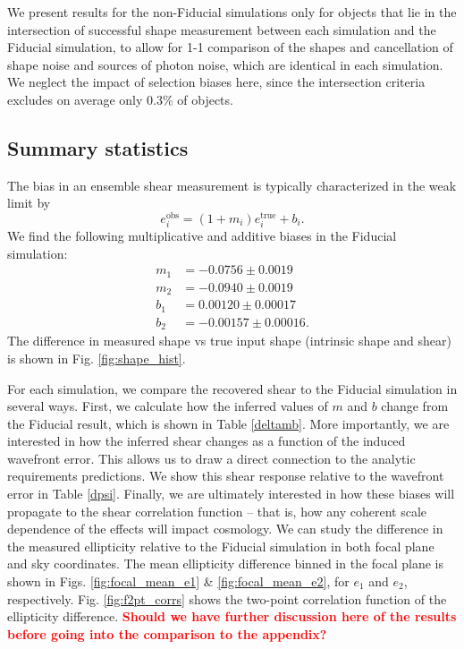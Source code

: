 \documentclass[aps,prd, amsmath,amssymb,superscriptaddress,showkeys,nofootinbib,reprint,preprintnumbers]{revtex4-1}
\newcommand{\verify}[1]{\textcolor{red}{\textbf{{#1}}}}
\begin{document}
We present results for the non-Fiducial simulations only for objects that lie in the intersection of successful shape measurement between each simulation and the Fiducial simulation, to allow for 1-1 comparison of the shapes and cancellation of shape noise and sources of photon noise, which are identical in each simulation. 
We neglect the impact of selection biases here, since the intersection criteria excludes on average only 0.3\% of objects.

\subsection{Summary statistics}

The bias in an ensemble shear measurement is typically characterized in the weak limit by 
\begin{equation}
e_i^{\mathrm{obs}} = (1+m_i) e_i^{\mathrm{true}} + b_i.
\end{equation}
We find the following multiplicative and additive biases in the Fiducial simulation: 
\begin{align*}
m_1 &= -0.0756 \pm 0.0019\\ 
m_2 &= -0.0940 \pm 0.0019\\ 
b_1 &= 0.00120 \pm 0.00017\\
b_2 &= -0.00157 \pm 0.00016.
\end{align*}
The difference in measured shape vs true input shape (intrinsic shape and shear) is shown in Fig. \ref{fig:shape_hist}.

For each simulation, we compare the recovered shear to the Fiducial simulation in several ways. First, we calculate how the inferred values of $m$ and $b$ change from the Fiducial result, which is shown in Table \ref{deltamb}. More importantly, we are interested in how the inferred shear changes as a function of the induced wavefront error. This allows us to draw a direct connection to the analytic requirements predictions. We show this shear response relative to the wavefront error in Table \ref{dpsi}. Finally, we are ultimately interested in how these biases will propagate to the shear correlation function -- that is, how any coherent scale dependence of the effects will impact cosmology. We can study the difference in the measured ellipticity relative to the Fiducial simulation in both focal plane and sky coordinates. The mean ellipticity difference binned in the focal plane is shown in Figs. \ref{fig:focal_mean_e1}  \& \ref{fig:focal_mean_e2}, for $e_1$ and $e_2$, respectively. Fig. \ref{fig:f2pt_corrs} shows the two-point correlation function of the ellipticity difference. 
\verify{Should we have further discussion here of the results before going into the comparison to the appendix?}
\end{document}
